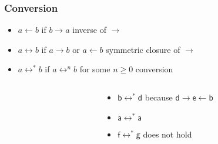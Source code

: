 \documentclass[12pt,aspectratio=169]{beamer}
\newcommand{\m}[1]{\mathsf{#1}}
\begin{document}
\begin{frame}
    \frametitle{Conversion}
    \begin{definition}
        \begin{itemize}
            \pause
            \item \alert{$a \leftarrow b$} if $b \rightarrow a$ \hfill \alert{inverse of $\rightarrow$}
            \pause
            \item \alert{$a \leftrightarrow b$} if $a \rightarrow b$ or $a \leftarrow b$ \hfill \alert{symmetric closure of $\rightarrow$}
            \pause
            \item \alert{$a \leftrightarrow^{*} b$} if $a \leftrightarrow^{n} b$ for some $n \geq 0$ \hfill \alert{conversion}
        \end{itemize}
    \end{definition}
    \pause

    \begin{example}
    \begin{columns}
        \begin{column}{0.35\textwidth}
            \centering
            \fig
        \end{column}
        \begin{column}{0.5\textwidth}
            \begin{itemize}
                \pause
                \item $\m{b} \leftrightarrow^{*} \m{d}$ \pause because $\m{d} \rightarrow \m{e} \leftarrow \m{b}$
                \pause
                \item $\m{a} \leftrightarrow^{*} \m{a}$
                \pause
                \item $\m{f} \leftrightarrow^{*} \m{g}$ does not hold
            \end{itemize}
        \end{column}
        \end{columns}
    \end{example}

\end{frame}
\end{document}
